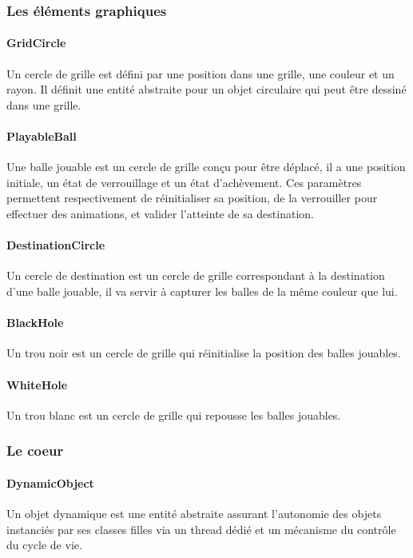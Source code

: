 \documentclass{article}
\begin{document}
\subsubsection{Les éléments graphiques}

\paragraph{GridCircle}
Un cercle de grille est défini par une position dans une grille, une couleur et un rayon. Il définit une entité abstraite pour un objet circulaire qui peut être dessiné dans une grille.

\paragraph{PlayableBall}
Une balle jouable est un cercle de grille conçu pour être déplacé, il a une position initiale, un état de verrouillage et un état d’achèvement. Ces paramètres permettent respectivement de réinitialiser sa position, de la verrouiller pour effectuer des animations, et valider l’atteinte de sa destination.

\paragraph{DestinationCircle}
Un cercle de destination est un cercle de grille correspondant à la destination d’une balle jouable, il va servir à capturer les balles de la même couleur que lui.

\paragraph{BlackHole}
Un trou noir est un cercle de grille qui réinitialise la position des balles jouables.

\paragraph{WhiteHole}
Un trou blanc est un cercle de grille qui repousse les balles jouables.

\subsubsection{Le coeur}

\paragraph{DynamicObject}
Un objet dynamique est une entité abstraite assurant l’autonomie des objets instanciés par ses classes filles via un thread dédié et un mécanisme du contrôle du cycle de vie.
\end{document}
